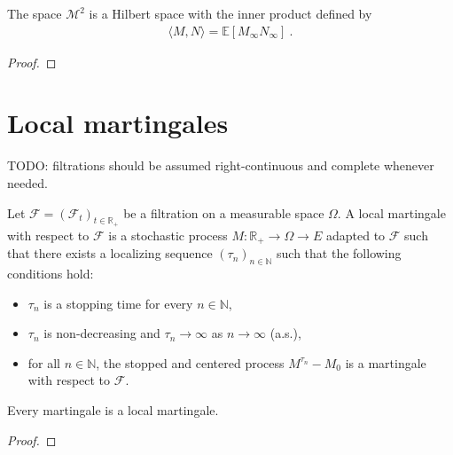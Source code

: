 \begin{theorem}\label{thm:hilbertSpace_squareIntegrableMartingales}
The space $\mathcal{M}^2$ is a Hilbert space with the inner product defined by
\begin{align*}
  \langle M, N \rangle = \mathbb{E}[M_\infty N_\infty]
  \: .
\end{align*}
\end{theorem}

\begin{proof}

\end{proof}


\section{Local martingales}

TODO: filtrations should be assumed right-continuous and complete whenever needed.

\begin{definition}\label{def:IsLocalMartingale}
Let $\mathcal{F} = (\mathcal{F}_t)_{t \in \mathbb{R}_+}$ be a filtration on a measurable space $\Omega$.
A local martingale with respect to $\mathcal{F}$ is a stochastic process $M : \mathbb{R}_+ \to \Omega \to E$ adapted to $\mathcal{F}$ such that there exists a localizing sequence $(\tau_n)_{n \in \mathbb{N}}$ such that the following conditions hold:
\begin{itemize}
  \item $\tau_n$ is a stopping time for every $n \in \mathbb{N}$,
  \item $\tau_n$ is non-decreasing and $\tau_n \to \infty$ as $n \to \infty$ (a.s.),
  \item for all $n \in \mathbb{N}$, the stopped and centered process $M^{\tau_n} - M_0$ is a martingale with respect to $\mathcal{F}$.
\end{itemize}
\end{definition}


\begin{lemma}\label{lem:Martingale.IsLocalMartingale}
Every martingale is a local martingale.
\end{lemma}

\begin{proof}

\end{proof}


